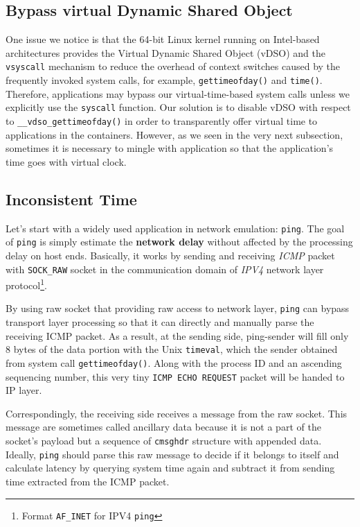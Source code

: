\documentclass{acm_proc_article-sp}
\begin{document}
\subsection{Bypass virtual Dynamic Shared Object}
One issue we notice is that the 64-bit Linux kernel running on Intel-based architectures provides the Virtual Dynamic Shared Object (vDSO) and the \texttt{vsyscall} mechanism to reduce the overhead of context switches caused by the frequently invoked system calls, 
for example, \texttt{gettimeofday()} and \texttt{time()}\cite{lwn:vdso}. 
Therefore, applications may bypass our virtual-time-based system calls unless we explicitly use the \texttt{syscall} function. 
Our solution is to disable vDSO with respect to \texttt{\_\_vdso\_gettimeofday()} in order to transparently offer virtual time to applications in the containers. 
However, as we seen in the very next subsection, sometimes it is necessary to mingle with application so that the application's time goes with virtual clock.

\subsection{Inconsistent Time}
Let's start with a widely used application in network emulation: \texttt{ping}. 
The goal of \texttt{ping} is simply estimate the \textbf{network delay} without affected by the processing delay on host ends. 
Basically, it\cite{iputils:ping} works by sending and receiving \textit{ICMP} packet with \texttt{SOCK\_RAW} socket\cite{linux:man:socket} in the communication domain of \textit{IPV4} network layer protocol\footnote{Format \texttt{AF\_INET} for IPV4 \texttt{ping}}. 

By using raw socket that providing raw access to network layer, \texttt{ping} can bypass transport layer processing so that it can directly and manually parse the receiving ICMP packet.
As a result, at the sending side, ping-sender will fill only 8 bytes of the data portion with the Unix \texttt{timeval}, which the sender obtained from system call \texttt{gettimeofday()}. 
Along with the process ID and an ascending sequencing number, this very tiny \texttt{ICMP ECHO REQUEST} packet will be handed to IP layer. 

Correspondingly, the receiving side receives a message from the raw socket. This message are sometimes called ancillary data because it is not a part of the socket's payload but a sequence of \texttt{cmsghdr} structure with appended data\cite{linux:man:cmsg}. Ideally, \texttt{ping} should parse this raw message to decide if it belongs to itself and calculate latency by querying system time again and subtract it from sending time extracted from the ICMP packet.
\end{document}
